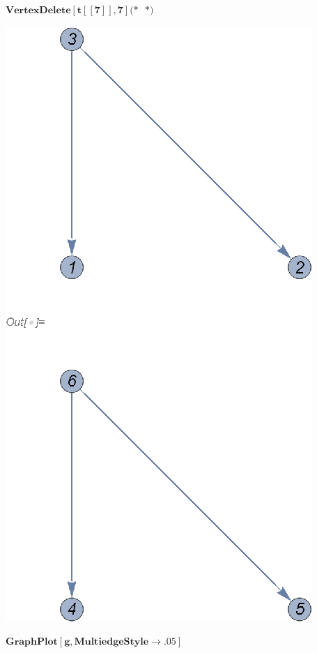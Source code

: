 \documentclass{article}
\newcommand{\unicode}[1]{{}}
\begin{document}
\begin{doublespace}
\noindent\(\pmb{\text{VertexDelete}[t[[7]],7]\text{(*$\unicode{043f}\unicode{043e}\unicode{043c}\unicode{0435}\unicode{0442}\unicode{0438}\unicode{0442}\unicode{044c}$
$\unicode{043d}\unicode{0430}$ $\unicode{0433}\unicode{0440}\unicode{0430}\unicode{0444}\unicode{0435}$*)}}\)
\end{doublespace}

\includegraphics{k1_gr7.eps}

\begin{doublespace}
\noindent\(\pmb{\text{GraphPlot}[g,\text{MultiedgeStyle}\to .05]}\)
\end{doublespace}
\end{document}
